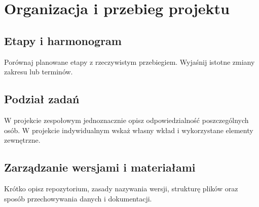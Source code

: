 \chapter{Organizacja i przebieg projektu}
\label{chap:organizacja}

\section{Etapy i harmonogram}
Porównaj planowane etapy z rzeczywistym przebiegiem. Wyjaśnij istotne zmiany zakresu lub terminów.

\section{Podział zadań}
W projekcie zespołowym jednoznacznie opisz odpowiedzialność poszczególnych osób. W projekcie indywidualnym wskaż własny wkład i wykorzystane elementy zewnętrzne.

\section{Zarządzanie wersjami i materiałami}
Krótko opisz repozytorium, zasady nazywania wersji, strukturę plików oraz sposób przechowywania danych i dokumentacji.
